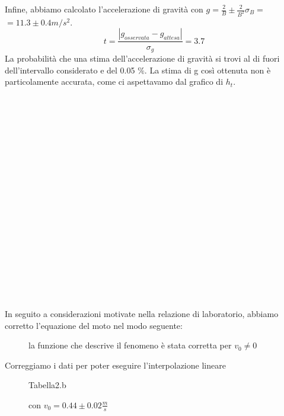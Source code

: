 \documentclass[a4paper]{article}
\theoremstyle{definition}
\begin{document}
\noindent Infine, abbiamo calcolato l'accelerazione di gravità con \(g = \frac{2}{B} \pm \frac{2}{B^{2}}\sigma_{B} = \) \\\(=11.3 \pm 0.4 m/s^{2}\).
\[t= \frac{\left | g_{osservata} - g_{attesa} \right |}{\sigma_{g}} = 3.7\]
La probabilità che una stima dell'accelerazione di gravità si trovi al di fuori dell'intervallo considerato e del 0.05 \(\%\). La stima di g così ottenuta non è particolamente accurata, come ci aspettavamo dal grafico di \(h_{t}\).\\\\\\\\\\\\\\\\\\\\\\\\\\\\\\\\\\\\\\\\
In seguito a considerazioni motivate nella relazione di laboratorio, abbiamo corretto l'equazione del moto nel modo seguente:
   
\begin{figure}[!htbp]
  	\captionsetup{labelformat=empty}
  	\caption{la funzione che descrive il fenomeno è stata corretta per \(v_{0}\neq 0\)}
\end{figure}

\noindent Correggiamo i dati per poter eseguire l'interpolazione lineare
\begin{figure}[!htbp]
	\captionsetup{labelformat=empty}
	\caption{Tabella2.b}
	\caption{con \(v_{0} = 0.44 \pm 0.02 \frac{m}{s}\)}
\end{figure}
\end{document}
